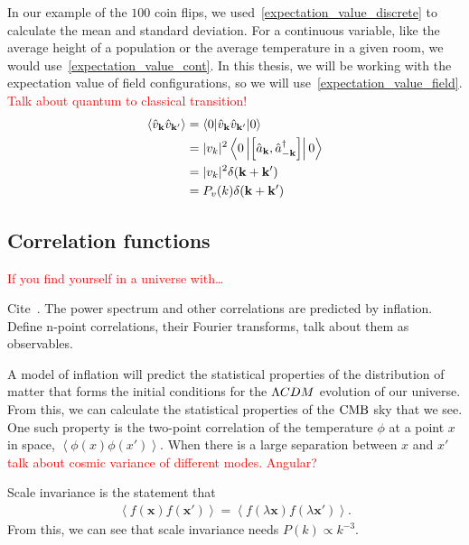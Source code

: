     In our example of the $100$ coin flips, we used~\eqref{expectation_value_discrete}
    to calculate the mean and standard deviation. For a continuous variable,
    like the average height of a population or the average temperature in a given room,
    we would use~\eqref{expectation_value_cont}. In this thesis, we will be working with
    the expectation value of field configurations, so we will use~\eqref{expectation_value_field}.
    \textcolor{red}{Talk about quantum to classical transition!}
    \begin{align}
        \left<\hat{v}_{\mathbf{k}}\hat{v}_{\mathbf{k}'}\right>
                         &= \left<0|\hat{v}_{\mathbf{k}}\hat{v}_{\mathbf{k}'}|0\right>\\
                         &= |v_k|^2\left<0\left|\left[\hat{a}_{\mathbf{k}},\hat{a}_{-\mathbf{k}}^{\dagger}\right]\right|0\right>\\
                         &= |v_k|^2\delta(\mathbf{k}+\mathbf{k}')\\
                         &= P_{v}(k)\delta(\mathbf{k}+\mathbf{k}')
    \end{align}


    \subsection{Correlation functions}\label{corr_functions}
    \textcolor{red}{If you find yourself in a universe with\ldots}


    Cite~\cite{Planck_inflation_2015, Planck_inflation_2018}.
    The power spectrum and other correlations
    are predicted by inflation. 
    Define n-point correlations, their Fourier transforms, talk about them as observables.
    

    A model of inflation will predict the statistical properties of the distribution of matter
    that forms the initial conditions for the $\Lambda CDM$ evolution of our universe.
    From this, we can calculate the statistical properties of the $\text{CMB}$ sky that we see.
    One such property is the two-point correlation of the temperature $\phi$
    at a point $x$ in space, $\left<\phi(x)\phi(x')\right>$. When there is a large
    separation between $x$ and $x'$ \textcolor{red}{talk about cosmic variance
    of different modes. Angular?}

    Scale invariance is the statement that
    \begin{align}
        \left<f(\mathbf{x})f(\mathbf{x'})\right> = \left<f(\lambda\mathbf{x})f(\lambda\mathbf{x'})\right>.
    \end{align}
    From this, we can see that scale invariance needs $P(k)\propto k^{-3}$.


